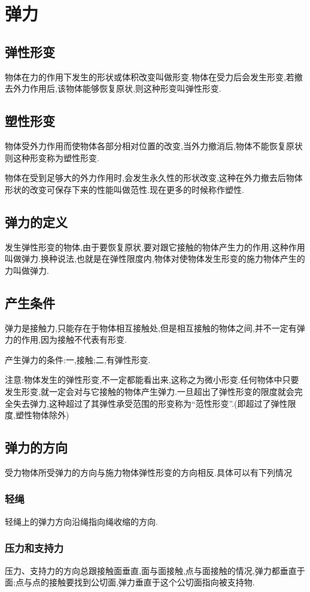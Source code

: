 \section{弹力}
\subsection{弹性形变}
物体在力的作用下发生的形状或体积改变叫做形变.物体在受力后会发生形变,若撤去外力作用后,该物体能够恢复原状,则这种形变叫弹性形变.

\subsection{塑性形变}
物体受外力作用而使物体各部分相对位置的改变,当外力撤消后,物体不能恢复原状则这种形变称为塑性形变.

物体在受到足够大的外力作用时,会发生永久性的形状改变,这种在外力撤去后物体形状的改变可保存下来的性能叫做范性.现在更多的时候称作塑性.

\subsection{弹力的定义}
发生弹性形变的物体,由于要恢复原状,要对跟它接触的物体产生力的作用,这种作用叫做弹力.换种说法,也就是在弹性限度内,物体对使物体发生形变的施力物体产生的力叫做弹力.

\subsection{产生条件}

弹力是接触力,只能存在于物体相互接触处,但是相互接触的物体之间,并不一定有弹力的作用,因为接触不代表有形变.

产生弹力的条件:一,接触;二,有弹性形变.

注意:物体发生的弹性形变,不一定都能看出来,这称之为微小形变.任何物体中只要发生形变,就一定会对与它接触的物体产生弹力.一旦超出了弹性形变的限度就会完全失去弹力,这种超过了其弹性承受范围的形变称为``范性形变''.(即超过了弹性限度,塑性物体除外)

\subsection{弹力的方向}
受力物体所受弹力的方向与施力物体弹性形变的方向相反.具体可以有下列情况
\subsubsection{轻绳}
轻绳上的弹力方向沿绳指向绳收缩的方向.
\subsubsection{压力和支持力}
压力、支持力的方向总跟接触面垂直,面与面接触,点与面接触的情况,弹力都垂直于面;点与点的接触要找到公切面,弹力垂直于这个公切面指向被支持物.
